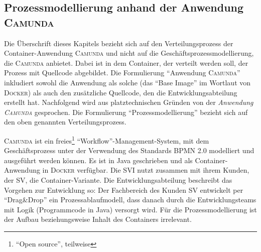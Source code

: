 \subsection{Prozessmodellierung anhand der Anwendung \textsc{Camunda}}
Die Überschrift dieses Kapitels bezieht sich auf den Verteilungsprozess der Container-Anwendung \textsc{Camunda} und nicht auf die Geschäftsprozessmodellierung, die \textsc{Camunda} anbietet. Dabei ist in dem Container, der verteilt werden soll, der Prozess mit Quellcode abgebildet. Die Formulierung \enquote{Anwendung \textsc{Camunda}} inkludiert sowohl die Anwendung als solche (das \enquote{Base Image} im Wortlaut von \textsc{Docker}) als auch den zusätzliche Quellcode, den die Entwicklungsabteilung erstellt hat. Nachfolgend wird aus platztechnischen Gründen von der \textit{Anwendung \textsc{Camunda}} gesprochen. Die Formulierung \enquote{Prozessmodellierung} bezieht sich auf den oben genannten Verteilungsprozess.
\par
\textsc{Camunda} ist ein freies\footnote{\enquote{Open source}, teilweise} \enquote{Workflow}-Management-System, mit dem Geschäftsprozess unter der Verwendung des Standards BPMN 2.0\autocite{object_management_group_omg_business_2011} modelliert und ausgeführt werden können.\autocite[vgl.][]{camunda_services_gmbh_workflow_2020} Es ist in Java geschrieben und als Container-Anwendung in \textsc{Docker} verfügbar. Die \ac{SVI} nutzt zusammen mit ihrem Kunden, der \ac{SV}, die Container-Variante. Die Entwicklungsabteilung beschreibt das Vorgehen zur Entwicklung so: Der Fachbereich des Kunden \ac{SV} entwickelt per \enquote{Drag\&Drop} ein Prozessablaufmodell, dass danach durch die Entwicklungsteams mit Logik (Programmcode in Java) versorgt wird. Für die Prozessmodellierung ist der Aufbau beziehungsweise Inhalt des Containers irrelevant. 
\par
